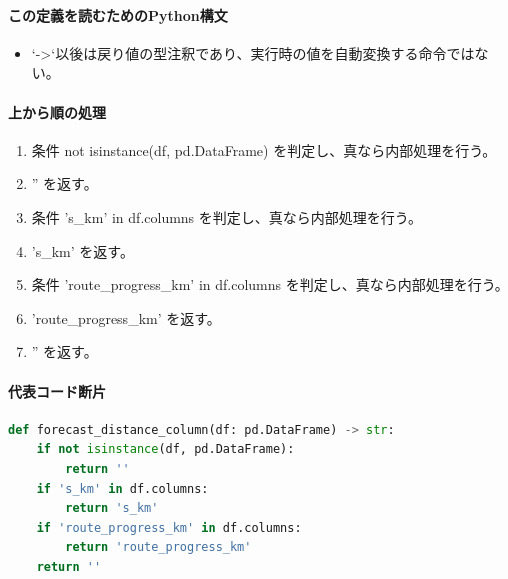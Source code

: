 \documentclass[a4paper,11pt]{article}
\begin{document}
            \paragraph{この定義を読むためのPython構文}
            \begin{itemize}[leftmargin=1.6em]
            \item `->`以後は戻り値の型注釈であり、実行時の値を自動変換する命令ではない。
            \end{itemize}
            \paragraph{上から順の処理}
            \begin{enumerate}[leftmargin=1.8em]
            \item 条件 not isinstance(df, pd.DataFrame) を判定し、真なら内部処理を行う。
\item   '' を返す。
\item 条件 's\_km' in df.columns を判定し、真なら内部処理を行う。
\item   's\_km' を返す。
\item 条件 'route\_progress\_km' in df.columns を判定し、真なら内部処理を行う。
\item   'route\_progress\_km' を返す。
\item '' を返す。
            \end{enumerate}
            \paragraph{代表コード断片}
            \begin{lstlisting}[language=Python]
def forecast_distance_column(df: pd.DataFrame) -> str:
    if not isinstance(df, pd.DataFrame):
        return ''
    if 's_km' in df.columns:
        return 's_km'
    if 'route_progress_km' in df.columns:
        return 'route_progress_km'
    return ''
\end{lstlisting}
\end{document}
